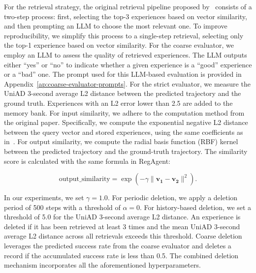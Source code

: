 \documentclass[11pt]{article}
\theoremstyle{plain}
\theoremstyle{definition}
\begin{document}
{For the retrieval strategy, the original retrieval pipeline proposed by~\cite{mao2023language} consists of a two-step process: first, selecting the top-3 experiences based on vector similarity, and then prompting an LLM to choose the most relevant one. To improve reproducibility, we simplify this process to a single-step retrieval, selecting only the top-1 experience based on vector similarity.
For the coarse evaluator, we employ an LLM to assess the quality of retrieved experiences. The LLM outputs either ``yes'' or ``no'' to indicate whether a given experience is a ``good'' experience or a ``bad'' one. The prompt used for this LLM-based evaluation is provided in Appendix~\ref{ap:coarse-evaluator-prompts}.
For the strict evaluator, we measure the UniAD 3-second average L2 distance between the predicted trajectory and the ground truth. Experiences with an L2 error lower than 2.5 are added to the memory bank.
For input similarity, we adhere to the computation method from the original paper. Specifically, we compute the exponential negative L2 distance between the query vector and stored experiences, using the same coefficients as in~\cite{mao2023language}.
For output similarity, we compute the radial basis function (RBF) kernel between the predicted trajectory and the ground-truth trajectory. The similarity score is calculated with the same formula in RegAgent:

\[
\text{output\_similarity} = \exp \left( -\gamma \|\mathbf{v_1} - \mathbf{v_2}\|^2 \right).
\]

In our experiments, we set $\gamma = 1.0$.
For periodic deletion, we apply a deletion period of 500 steps with a threshold of $\alpha = 0$.
For history-based deletion, we set a threshold of 5.0 for the UniAD 3-second average L2 distance. An experience is deleted if it has been retrieved at least 3 times and the mean UniAD 3-second average L2 distance across all retrievals exceeds this threshold. Coarse deletion leverages the predicted success rate from the coarse evaluator and deletes a record if the accumulated success rate is less than 0.5.
The combined deletion mechanism incorporates all the aforementioned hyperparameters.


}
\end{document}

